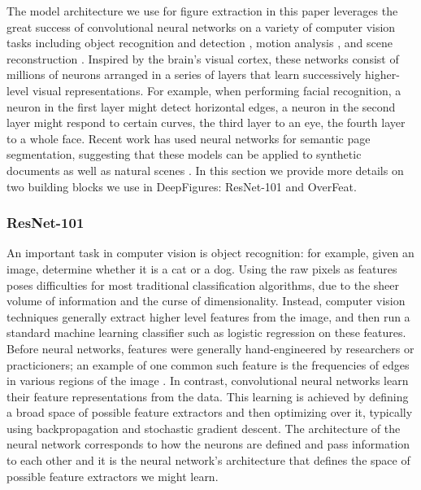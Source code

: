 \documentclass[sigconf]{acmart}
\begin{document}
The model architecture we use for figure extraction in this paper leverages the great success of convolutional neural networks on a variety of computer vision tasks including object recognition and detection \cite{resnet}, motion analysis \cite{Dosovitskiy2015FlowNet}, and scene reconstruction \cite{Yang2016Realtime3S}.
Inspired by the brain's visual cortex, these networks consist of millions of neurons arranged in a series of layers that learn successively higher-level visual representations. 
For example, when performing facial recognition, a neuron in the first layer might detect horizontal edges, a neuron in the second layer might respond to certain curves, the third layer to an eye, the fourth layer to a whole face. Recent work has used neural networks for semantic page segmentation, suggesting that these models can be applied to synthetic documents as well as natural scenes \cite{Chen2015ICDAR,Yang2017CVPR,He2017ICDAR}.
In this section we provide more details on two building blocks we use in DeepFigures: ResNet-101 and OverFeat.

\subsubsection{ResNet-101}

An important task in computer vision is object recognition: for example, given an image, determine whether it is a cat or a dog. Using the raw pixels as features poses difficulties for most traditional classification algorithms, due to the sheer volume of information and the curse of dimensionality. Instead, computer vision techniques generally extract higher level features from the image, and then run a standard machine learning classifier such as logistic regression on these features. Before neural networks, features were generally hand-engineered by researchers or practicioners; an example of one common such feature is the frequencies of edges in various regions of the image \cite{Dalal2005HOG}. In contrast, convolutional neural networks learn their feature representations from the data. This learning is achieved by defining a broad space of possible feature extractors and then optimizing over it, typically using backpropagation and stochastic gradient descent. The architecture of the neural network corresponds to how the neurons are defined and pass information to each other and it is the neural network's architecture that defines the space of possible feature extractors we might learn.
\end{document}
